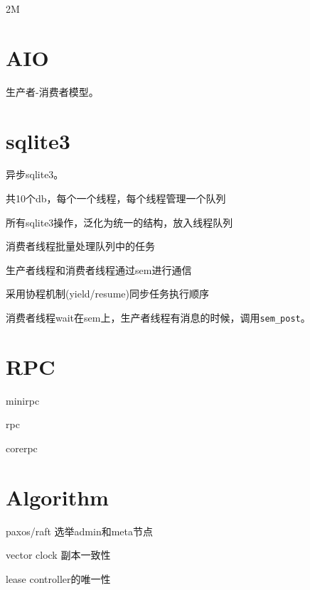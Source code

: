 2M

\section{AIO}

生产者-消费者模型。

\section{sqlite3}

异步sqlite3。

\begin{compactitem}
    \item 共10个db，每个一个线程，每个线程管理一个队列
    \item 所有sqlite3操作，泛化为统一的结构，放入线程队列
    \item 消费者线程批量处理队列中的任务
    \item 生产者线程和消费者线程通过sem进行通信
    \item 采用协程机制(yield/resume)同步任务执行顺序
\end{compactitem}

消费者线程wait在sem上，生产者线程有消息的时候，调用\verb|sem_post|。

\section{RPC}

\begin{compactitem}
    \item minirpc
    \item rpc
    \item corerpc
\end{compactitem}

\section{Algorithm}

\begin{compactitem}
    \item paxos/raft 选举admin和meta节点
    \item vector clock 副本一致性
    \item lease controller的唯一性
\end{compactitem}

